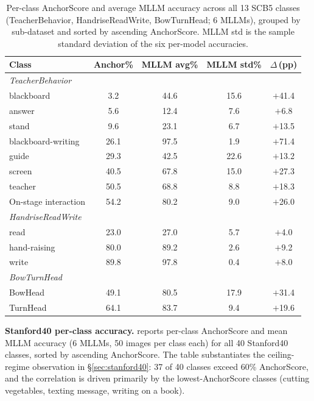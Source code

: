 \documentclass[a4paper,fleqn]{cas-sc}
\begin{document}
\begin{table}[t]
\caption{Per-class AnchorScore and average MLLM accuracy across all 13 SCB5 classes (TeacherBehavior, HandriseReadWrite, BowTurnHead; 6 MLLMs), grouped by sub-dataset and sorted by ascending AnchorScore. MLLM std is the sample standard deviation of the six per-model accuracies.}
\label{tab:per_class_tb}
\centering
\footnotesize
\setlength{\tabcolsep}{2.8pt}
\begin{tabular}{lcccc}
\toprule
\textbf{Class} & \textbf{Anchor\%} & \textbf{MLLM avg\%} & \textbf{MLLM std\%} & $\Delta$\,(pp) \\
\midrule
\multicolumn{5}{l}{\textit{TeacherBehavior}} \\
blackboard & 3.2 & 44.6 & 15.6 & $+$41.4 \\
answer & 5.6 & 12.4 & 7.6 & $+$6.8 \\
stand & 9.6 & 23.1 & 6.7 & $+$13.5 \\
blackboard-writing & 26.1 & 97.5 & 1.9 & $+$71.4 \\
guide & 29.3 & 42.5 & 22.6 & $+$13.2 \\
screen & 40.5 & 67.8 & 15.0 & $+$27.3 \\
teacher & 50.5 & 68.8 & 8.8 & $+$18.3 \\
On-stage interaction & 54.2 & 80.2 & 9.0 & $+$26.0 \\
\midrule
\multicolumn{5}{l}{\textit{HandriseReadWrite}} \\
read & 23.0 & 27.0 & 5.7 & $+$4.0 \\
hand-raising & 80.0 & 89.2 & 2.6 & $+$9.2 \\
write & 89.8 & 97.8 & 0.4 & $+$8.0 \\
\midrule
\multicolumn{5}{l}{\textit{BowTurnHead}} \\
BowHead & 49.1 & 80.5 & 17.9 & $+$31.4 \\
TurnHead & 64.1 & 83.7 & 9.4 & $+$19.6 \\
\bottomrule
\end{tabular}
\end{table}

\textbf{Stanford40 per-class accuracy.}  reports per-class AnchorScore and mean MLLM accuracy (6 MLLMs, 50 images per class each) for all 40 Stanford40 classes, sorted by ascending AnchorScore. The table substantiates the ceiling-regime observation in \S\ref{sec:stanford40}: 37 of 40 classes exceed 60\% AnchorScore, and the correlation is driven primarily by the lowest-AnchorScore classes (cutting vegetables, texting message, writing on a book).
\end{document}
